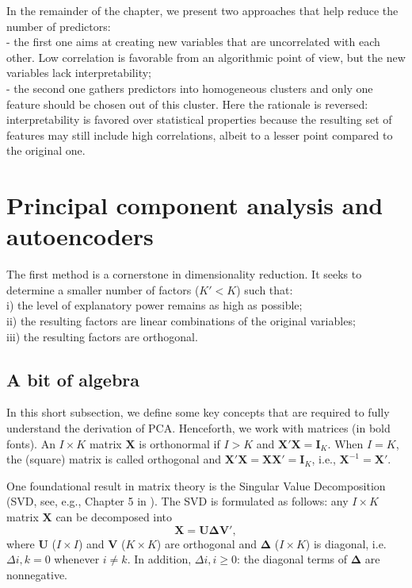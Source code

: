 \documentclass[]{krantz}
\theoremstyle{definition}
\theoremstyle{definition}
\theoremstyle{definition}
\theoremstyle{remark}
\begin{document}
In the remainder of the chapter, we present two approaches that help
reduce the number of predictors:\\
- the first one aims at creating new variables that are uncorrelated
with each other. Low correlation is favorable from an algorithmic point
of view, but the new variables lack interpretability;\\
- the second one gathers predictors into homogeneous clusters and only
one feature should be chosen out of this cluster. Here the rationale is
reversed: interpretability is favored over statistical properties
because the resulting set of features may still include high
correlations, albeit to a lesser point compared to the original one.

\hypertarget{principal-component-analysis-and-autoencoders}{%
\section{Principal component analysis and
autoencoders}\label{principal-component-analysis-and-autoencoders}}

The first method is a cornerstone in dimensionality reduction. It seeks
to determine a smaller number of factors (\(K'<K\)) such that:\\
i) the level of explanatory power remains as high as possible;\\
ii) the resulting factors are linear combinations of the original
variables;\\
iii) the resulting factors are orthogonal.

\hypertarget{a-bit-of-algebra}{%
\subsection{A bit of algebra}\label{a-bit-of-algebra}}

In this short subsection, we define some key concepts that are required
to fully understand the derivation of PCA. Henceforth, we work with
matrices (in bold fonts). An \(I \times K\) matrix \(\textbf{X}\) is
orthonormal if \(I> K\) and \(\textbf{X}'\textbf{X}=\textbf{I}_K\). When
\(I=K\), the (square) matrix is called orthogonal and
\(\textbf{X}'\textbf{X}=\textbf{X}\textbf{X}'=\textbf{I}_K\), i.e.,
\(\textbf{X}^{-1}=\textbf{X}'\).

One foundational result in matrix theory is the Singular Value
Decomposition (SVD, see, e.g., Chapter 5 in \citet{meyer2000matrix}).
The SVD is formulated as follows: any \(I \times K\) matrix
\(\textbf{X}\) can be decomposed into \begin{equation}
\label{eq:svd}
\textbf{X}=\textbf{U} \boldsymbol{\Delta} \textbf{V}',
\end{equation} where \(\textbf{U}\) (\(I\times I\)) and \(\textbf{V}\)
(\(K \times K\)) are orthogonal and \(\boldsymbol{\Delta}\)
(\(I\times K\)) is diagonal, i.e. \(\Delta{i,k}=0\) whenever
\(i\neq k\). In addition, \(\Delta{i,i}\ge 0\): the diagonal terms of
\(\boldsymbol{\Delta}\) are nonnegative.
\end{document}
